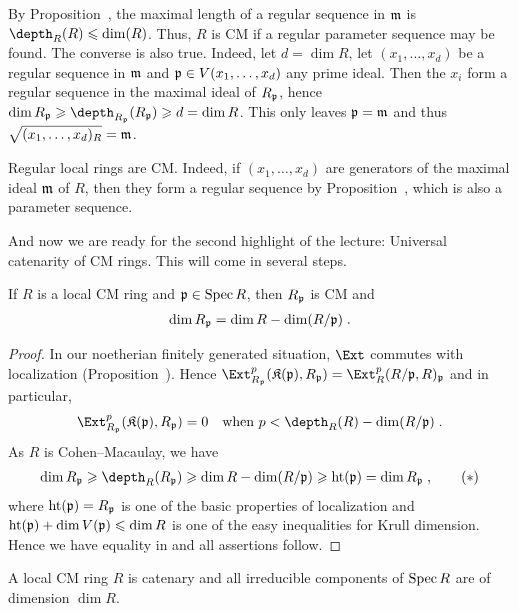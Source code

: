 \documentclass[a4paper,parskip=half,numbers=enddot, DIV=12]{scrreprt}
\renewcommand{\geq}{\geqslant}
\renewcommand{\leq}{\leqslant}
\begin{document}
By Proposition~, the maximal length of a regular sequence in $\mathfrak{m}$ is $\depth_R(R)\leq\dim(R)$. Thus, $R$ is CM if a regular parameter sequence may be found. The converse is also true. Indeed, let $d=\dim R$, let $(x_1,\ldots,x_d)$ be a regular sequence in $\mathfrak{m}$ and $\mathfrak{p}\in V(x_1,\ldots,x_d)$ any prime ideal. Then the $x_i$ form a regular sequence in the maximal ideal of $R_{\mathfrak{p}}$, hence $\dim R_\pp\geq\depth_{R_\pp}(R_\pp)\geq d=\dim R$. This only leaves $\mathfrak{p}=\mathfrak{m}$ and thus $\sqrt{(x_1,\ldots,x_d)_R}=\mathfrak{m}$.
\begin{example}
	Regular local rings are CM. Indeed, if $(x_1,\ldots,x_d)$ are generators of the maximal ideal $\mathfrak{m}$ of $R$, then they form a regular sequence by Proposition~, which is also a parameter sequence.
\end{example}
And now we are ready for the second highlight of the lecture: Universal catenarity of CM rings. This will come in several steps.
\begin{prop}
	If $R$ is a local CM ring and $\mathfrak{p}\in\operatorname{Spec} R$, then $R_{\mathfrak{p}}$ is CM and
	\begin{align*}
		\dim R_{\mathfrak{p}}=\dim R-\dim (R/\mathfrak{p})\;.
	\end{align*}
\end{prop}
\begin{proof}
	In our noetherian finitely generated situation, $\Ext$ commutes with localization (Proposition~). Hence $\Ext_{R_\pp}^p(\KK(\pp),R_\pp)=\Ext_R^p(R/\pp,R)_\pp$ and in particular,
	\begin{align*}
		\Ext_{R_\pp}^p(\KK(\pp),R_\pp)=0\quad\text{when }p<\depth_R(R)-\dim(R/\pp)\;.
	\end{align*}
	As $R$ is Cohen--Macaulay, we have
	\begin{align}\lbl{eq:dimRp}
		\dim R_\pp\geq\depth_R(R_\pp)\geq \dim R-\dim(R/\pp)\geq\hoehe(\pp)=\dim R_\pp\;,\tag{$*$}
	\end{align}
	where $\operatorname{ht}(\mathfrak{p})=R_{\mathfrak{p}}$ is one of the basic properties of localization and $\hoehe(\pp)+\dim V(\pp)\leq \dim R$ is one of the easy inequalities for Krull dimension. Hence we have equality in  and all assertions follow.
\end{proof}
\begin{cor}
	A local CM ring $R$ is catenary and all irreducible components of $\operatorname{Spec} R$ are of dimension $\dim R$.
\end{cor}
\end{document}
